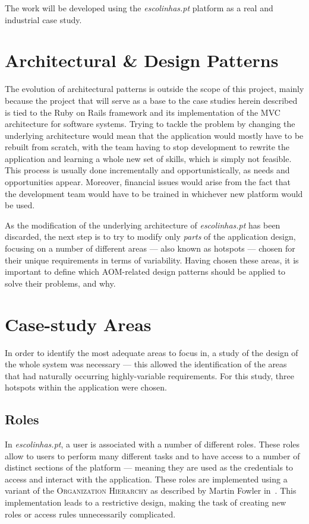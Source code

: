 The work will be developed using the \emph{escolinhas.pt} platform as a real and industrial case study.

\section{Architectural \& Design Patterns}\label{sec:architectural_patterns}

The evolution of architectural patterns is outside the scope of this project, mainly because the project that will serve as a base to the case studies herein described is tied to the Ruby on Rails framework and its implementation of the MVC architecture for software systems. Trying to tackle the problem by changing the underlying architecture would mean that the application would mostly have to be rebuilt from scratch, with the team having to stop development to rewrite the application and learning a whole new set of skills, which is simply not feasible. This process is usually done incrementally and opportunistically, as needs and opportunities appear. Moreover, financial issues would arise from the fact that the development team would have to be trained in whichever new platform would be used.

As the modification of the underlying architecture of \emph{escolinhas.pt} has been discarded, the next step is to try to modify only \emph{parts} of the application design, focusing on a number of different areas --- also known as hotspots --- chosen for their unique requirements in terms of variability. Having chosen these areas, it is important to define which AOM-related design patterns should be applied to solve their problems, and why.

\section{Case-study Areas}\label{sec:case-study_areas}

In order to identify the most adequate areas to focus in, a study of the design of the whole system was necessary --- this allowed the identification of the areas that had naturally occurring highly-variable requirements. For this study, three hotspots within the application were chosen.

\subsection{Roles}\label{sec:case-study_areas_roles}

In \emph{escolinhas.pt}, a user is associated with a number of different roles. These roles allow to users to perform many different tasks and to have access to a number of distinct sections of the platform --- meaning they are used as the credentials to access and interact with the application. These roles are implemented using a variant of the \textsc{Organization Hierarchy} as described by Martin Fowler in~\cite{fowler_accountability}. This implementation leads to a restrictive design, making the task of creating new roles or access rules unnecessarily complicated.
  
